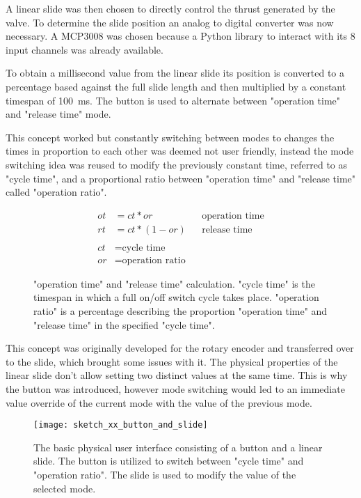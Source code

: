 A linear slide was then chosen to directly control the thrust generated by the valve. To determine the slide position an analog to digital converter was now necessary. A MCP3008 \cite{mcp3008} was chosen because a Python library \cite{mcp3008-library} to interact with its 8 input channels was already available. 

To obtain a millisecond value from the linear slide its position is converted to a percentage based against the full slide length and then multiplied by a constant timespan of \SI{100}{\milli\second}. The button is used to alternate between "operation time" and "release time" mode. 

This concept worked but constantly switching between modes to changes the times in proportion to each other was deemed not user friendly, instead the mode switching idea was reused to modify the previously constant time, referred to as "cycle time", and a proportional ratio between "operation time" and "release time" called "operation ratio".

\begin{figure}[h]
\begin{align*}
    ot &=ct * or && \text{operation time} \\
    rt &=ct * (1 - or) && \text{release time} \\ \\
    ct &= \text{cycle time} \\
    or &= \text{operation ratio}
\end{align*}
\caption{"operation time" and "release time" calculation. "cycle time" is the timespan in which a full on/off switch cycle takes place. "operation ratio" is a percentage describing the proportion "operation time" and "release time" in the specified "cycle time".}
\end{figure}

This concept was originally developed for the rotary encoder and transferred over to the slide, which brought some issues with it. The physical properties of the linear slide don't allow setting two distinct values at the same time. This is why the button was introduced, however mode switching would led to an immediate value override of the current mode with the value of the previous mode.

\begin{figure}[h]
\centering

\texttt{[image: sketch\_xx\_button\_and\_slide]}


\caption{The basic physical user interface consisting of a button and a linear slide. The button is utilized to switch between "cycle time" and "operation ratio". The slide is used to modify the value of the selected mode.}
\end{figure}


